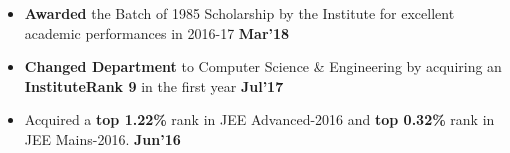 \documentclass[10pt]{article}
\begin{document}
\begin{itemize}[leftmargin=*]
\item \textbf{Awarded} the Batch of 1985 Scholarship by the Institute for excellent academic performances in 2016-17 \href{https://github.com/shmundhra/Credentials/tree/master/Academics} {\hspace{0.5ex}\footnotesize\faMousePointer} {\hfill}\textbf{Mar'18}\\[-1.8em]
\item \textbf{Changed Department} to Computer Science \& Engineering by acquiring an \textbf{InstituteRank 9} in the first year \href{https://github.com/shmundhra/Credentials/tree/master/Academics} {\hspace{0.5ex}\footnotesize\faMousePointer} {\hfill}\textbf{Jul'17}\\[-1.8em]
\item Acquired a \textbf{top 1.22\%} rank in JEE Advanced-2016 and \textbf{top 0.32\%} rank in JEE Mains-2016. \href{https://github.com/shmundhra/Credentials/tree/master/Academics} {\hspace{0.5ex}\footnotesize\faMousePointer} {\hfill}\textbf{Jun'16}\\[-1.8em]
\end{itemize}
\end{document}
